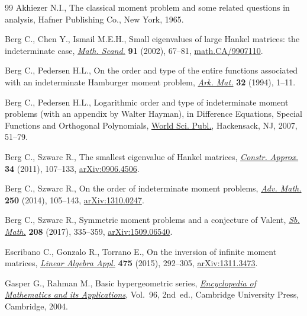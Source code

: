 \documentclass[11pt]{article}
\numberwithin{equation}{section}
\begin{document}
\begin{thebibliography}{99}
Akhiezer N.I., The classical moment problem and some related questions in
 analysis, Hafner Publishing Co., New York, 1965.

Berg C., Chen Y., Ismail M.E.H., Small eigenvalues of large {H}ankel matrices:
 the indeterminate case, \href{https://doi.org/10.7146/math.scand.a-14379}{\textit{Math. Scand.}} \textbf{91} (2002), 67--81,
 \href{https://arxiv.org/abs/math.CA/9907110}{math.CA/9907110}.

Berg C., Pedersen H.L., On the order and type of the entire functions
 associated with an indeterminate {H}amburger moment problem, \href{https://doi.org/10.1007/BF02559520}{\textit{Ark.
 Mat.}} \textbf{32} (1994), 1--11.

Berg C., Pedersen H.L., Logarithmic order and type of indeterminate moment
 problems (with an appendix by {W}alter {H}ayman), in Difference Equations,
 Special Functions and Orthogonal Polynomials,
 \href{https://doi.org/10.1142/9789812770752_0005}{World Sci. Publ.}, Hackensack, NJ, 2007, 51--79.

Berg C., Szwarc R., The smallest eigenvalue of {H}ankel matrices,
 \href{https://doi.org/10.1007/s00365-010-9109-4}{\textit{Constr. Approx.}} \textbf{34} (2011), 107--133, \href{https://arxiv.org/abs/0906.4506}{arXiv:0906.4506}.

Berg C., Szwarc R., On the order of indeterminate moment problems, \href{https://doi.org/10.1016/j.aim.2013.09.020}{\textit{Adv.
 Math.}} \textbf{250} (2014), 105--143, \href{https://arxiv.org/abs/1310.0247}{arXiv:1310.0247}.

Berg C., Szwarc R., Symmetric moment problems and a conjecture of {V}alent,
 \href{https://doi.org/10.1070/SM8732}{\textit{Sb. Math.}} \textbf{208} (2017), 335--359, \href{https://arxiv.org/abs/1509.06540}{arXiv:1509.06540}.

Escribano C., Gonzalo R., Torrano E., On the inversion of infinite moment
 matrices, \href{https://doi.org/10.1016/j.laa.2015.02.031}{\textit{Linear Algebra Appl.}} \textbf{475} (2015), 292--305,
 \href{https://arxiv.org/abs/1311.3473}{arXiv:1311.3473}.

Gasper G., Rahman M., Basic hypergeometric series, \href{https://doi.org/10.1017/CBO9780511526251}{\textit{Encyclopedia of
 Mathematics and its Applications}}, Vol.~96, 2nd~ed., Cambridge University
 Press, Cambridge, 2004.


\end{thebibliography}
\end{document}
